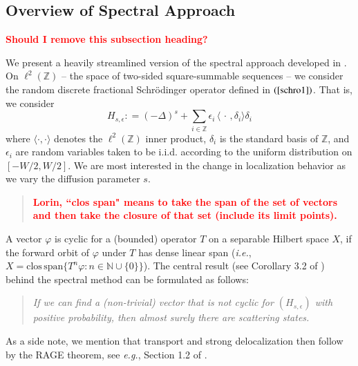 \documentclass[final,1p,times]{elsarticle}
\def\NN{\mathbb N} %
\def\ZZ{\mathbb Z} %
\newcommand{\bb}[1]{\begin{equation}\label{#1}}
\newcommand{\ee}{\end{equation}}
\newcommand{\no}{\noindent}
\def\R#1{$(\ref{#1})$}
\theoremstyle{remark}
\theoremstyle{definition}
\newcommand{\josh}[1]{\textcolor{red}{\textbf{#1}}}
\begin{document}
\subsection{Overview of Spectral Approach}

\no\josh{Should I remove this subsection heading?}

\vspace{3mm}

We present a heavily streamlined version of the spectral approach developed in \cite{Liaw2013}. On $\ell^2(\ZZ)$ -- the space of two-sided  square-summable sequences -- we consider the random discrete fractional Schr{\"o}dinger operator defined in \R{schro1}. That is, we consider
$$
H_{s,\epsilon} \mathrel{\mathop:}= (-\Delta)^s + \sum_{i\in\ZZ}\epsilon_i\,\langle \,\cdot\,,\delta_i\rangle \delta_i
$$
where $\langle \cdot, \cdot\rangle$ denotes the $\ell^2 (\ZZ)$ inner product, $\delta_i$ is the standard basis of $\ZZ$, and $\epsilon_i$ are random variables taken to be i.i.d. according to the uniform distribution on $[-W/2,W/2]$. We are most interested in the change in localization behavior as we vary the diffusion parameter $s$.

\begin{quote}
\josh{Lorin, ``clos span" means to take the span of the set of vectors and then take the closure of that set (include its limit points).}
\end{quote}

A vector $\varphi$ is cyclic for a (bounded) operator $T$ on a separable Hilbert space $X$, if the forward orbit of $\varphi$ under $T$ has dense linear span ({\em i.e.}, $X = \text{clos}\,\text{span}\{T^n \varphi:n\in \NN\cup\{0\}\}$).
The central result (see Corollary 3.2 of \cite{Liaw2013}) behind the spectral method can be formulated as follows:
\begin{quote}
{\em If we can find a (non-trivial) vector that is not cyclic for $(H_{s,\epsilon})$ with positive probability, then almost surely there are scattering states.}
\end{quote}
As a side note, we mention that transport and strong delocalization then follow by the RAGE theorem, see {\em e.g.}, Section 1.2 of \cite{MR2603225}.
\end{document}
